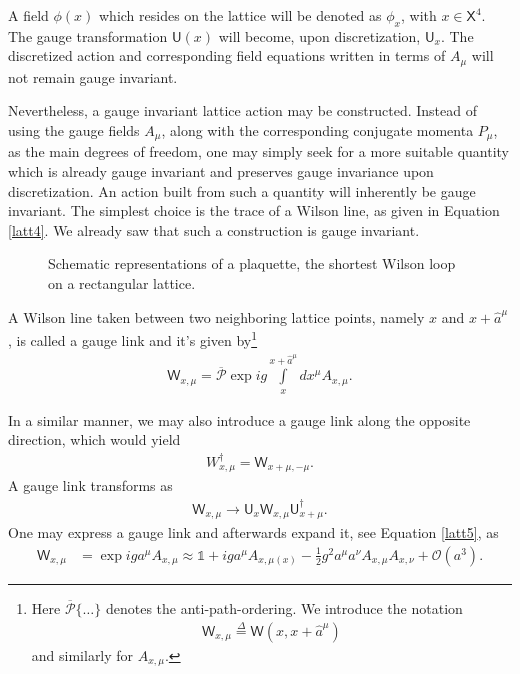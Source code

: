 A field $\phi(x)$ which resides on the lattice will be denoted as $\phi_x$, with $x\in\textsf{X}^4$. The gauge transformation $\textsf{U}(x)$ will become, upon discretization, $\textsf{U}_x$. The discretized action and corresponding field equations written in terms of $A_\mu$ will not remain gauge invariant.

Nevertheless, a gauge invariant lattice action may be constructed. Instead of using the gauge fields $A_\mu$, along with the corresponding conjugate momenta $P_\mu$, as the main degrees of freedom, one may simply seek for a more suitable quantity which is already gauge invariant and preserves gauge invariance upon discretization. An action built from such a quantity will inherently be gauge invariant. The simplest choice is the trace of a Wilson line, as given in Equation \cref{latt4}. We already saw that such a construction is gauge invariant.

\begin{figure}
    \centering
    \qquad
    \caption{Schematic representations of a plaquette, the shortest Wilson loop on a rectangular lattice.}%
    \label{fig:plaquettes}%
\end{figure}

A Wilson line taken between two neighboring lattice points, namely $x$ and $x+\hat{a}^{\mu}$, is called a {\sffamily\color{maincolor}gauge link} and it's given by\footnote{Here $\overline{\mathcal{P}}\{\ldots\}$ denotes the anti-path-ordering. We introduce the notation
\begin{align*}
    \textsf{W}_{x,\mu}\overset{\Delta}{=}\textsf{W}(x,x+\hat{a}^{\mu})
\end{align*}
and similarly for $A_{x,\mu}$.
}
\begin{align*}
    \textsf{W}_{x, \mu}=\overline{\mathcal{P}} \exp{i g \int\limits_{x}^{x+\hat{a}^{\mu}} d x^{\mu} A_{x,\mu}}.
\end{align*}

\begin{remark}
In a similar manner, we may also introduce a gauge link along the opposite direction, which would yield
\begin{align}\label{latt6}
    W_{x,\mu}^{\dagger}=\textsf{W}_{x+\mu,-\mu}.
\end{align}
A gauge link transforms as
\begin{align*}
    \textsf{W}_{x, \mu} \rightarrow \textsf{U}_{x} \textsf{W}_{x, \mu} \textsf{U}_{x+\mu}^{\dagger}.
\end{align*}
One may express a gauge link and afterwards expand it, see Equation \cref{latt5}, as
\begin{equation*}
    \begin{aligned}
     \textsf{W}_{x,\mu}&=\exp{iga^\mu A_{x,\mu}}\approx \mathds{1}+iga^\mu A_{x,\mu(x)}-\frac{1}{2}g^2a^\mu a^\nu A_{x,\mu}A_
     {x,\nu}+\mathcal{O}(a^3).
\end{aligned}
\end{equation*}
\end{remark}

